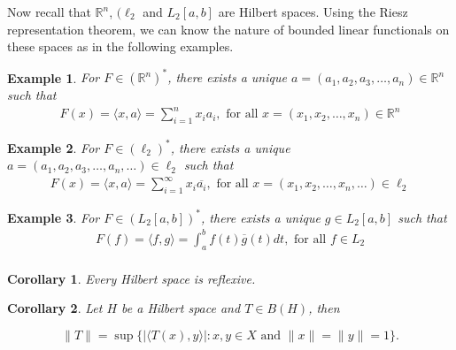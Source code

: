 \documentclass{report}
\newtheorem{exm}{Example}
\newtheorem{cor}{Corollary}
\begin{document}
Now recall that $\mathbb{R}^n$, $(\ell_2$ and $L_2[a,b]$ are Hilbert spaces. Using the Riesz representation theorem, we can know the nature of bounded linear functionals on these spaces as in the following examples.

\begin{exm}
    For $F \in (\mathbb{R}^n)^{*}$, there exists a unique $a = (a_1, a_2, a_3, \dots, a_n) \in \mathbb{R}^n$ such that
    \begin{align*}
        F(x) = \langle x, a \rangle = \sum_{i=1}^{n} x_i a_i ,  \text{ for all } x = (x_1, x_2, \dots, x_n) \in \mathbb{R}^n
    \end{align*}
\end{exm}

\begin{exm}
   For $F \in (\ell_2)^{*}$, there exists a unique $a = (a_1, a_2, a_3, \dots, a_n, \dots) \in \ell_2$ such that
    \begin{align*}
        F(x) = \langle x, a \rangle = \sum_{i=1}^{\infty} x_i \overline{a_i}, \text{ for all } x = (x_1, x_2, \dots, x_n, \dots) \in \ell_2 
    \end{align*} 
\end{exm}

\begin{exm}
    For $F \in (L_2[a,b])^{*}$, there exists a unique $g \in L_2[a,b]$ such that
    \begin{align*}
        F(f) = \langle f, g \rangle = \int_{a}^{b} f(t) \overline{g}(t) dt, \text{ for all } f \in L_2 \\
    \end{align*}
\end{exm}


\begin{cor}
    Every Hilbert space is reflexive.
\end{cor}

\begin{cor} %
    Let $H$ be a Hilbert space and $T \in B(H)$, then

    $$
    \|T\|  = \sup \{ | \langle T(x), y \rangle | : x, y \in X \text{ and } \|x\| = \|y\| = 1 \}.
    $$
\end{cor}
\end{document}
